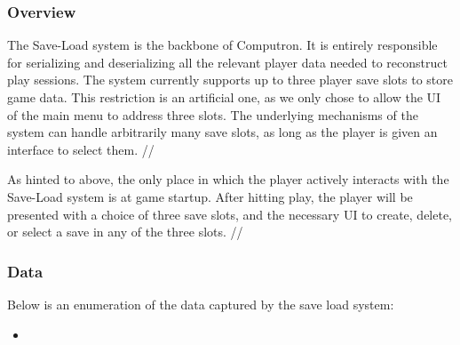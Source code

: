 \subsubsection{Overview}
The Save-Load system is the backbone of Computron. It is entirely responsible for serializing and deserializing all the relevant player data needed to reconstruct play sessions. The system currently supports up to three player save slots to store game data. This restriction is an artificial one, as we only chose to allow the UI of the main menu to address three slots. The underlying mechanisms of the system can handle arbitrarily many save slots, as long as the player is given an interface to select them. //

As hinted to above, the only place in which the player actively interacts with the Save-Load system is at game startup. After hitting play, the player will be presented with a choice of three save slots, and the necessary UI to create, delete, or select a save in any of the three slots. //

\subsubsection{Data}
Below is an enumeration of the data captured by the save load system:
\begin{itemize}
    \item 
\end{itemize}